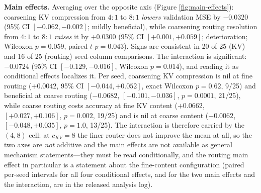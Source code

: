 \textbf{Main effects.} Averaging over the opposite axis (Figure
\ref{fig:main-effects}): coarsening KV compression from $4{:}1$ to $8{:}1$
\emph{lowers} validation MSE by $-0.0320$ (95\% CI $[-0.062, -0.002]$; mildly beneficial),
while
coarsening routing resolution from $4{:}1$ to $8{:}1$ \emph{raises} it by
$+0.0300$ (95\% CI $[+0.001, +0.059]$; deterioration; Wilcoxon $p = 0.059$,
paired $t$ $p = 0.043$). Signs are consistent in 20 of 25 (KV) and 16 of 25
(routing) seed-column comparisons. The interaction is significant:
$-0.0724$ (95\% CI $[-0.129, -0.016]$, Wilcoxon $p = 0.014$), and reading it as
conditional effects localizes it. Per seed, coarsening KV compression is nil at
fine routing ($+0.0042$, 95\% CI $[-0.044, +0.052]$, exact Wilcoxon $p = 0.62$,
9/25) and beneficial at coarse routing ($-0.0682$, $[-0.101, -0.036]$,
$p = 0.0001$, 21/25), while coarse routing costs accuracy at fine KV content
($+0.0662$, $[+0.027, +0.106]$, $p = 0.002$, 19/25) and is nil at coarse content
($-0.0062$, $[-0.048, +0.035]$, $p = 1.0$, 13/25). The interaction is therefore carried by the
$(4,8)$ cell: at $c_{KV}{=}8$ the finer router does not improve the
mean at all, so the two axes are \emph{not} additive and the main effects are not
available as general mechanism statements---they must be read conditionally, and
the routing main effect in particular is a statement about the fine-content
configuration (paired per-seed intervals for all four conditional effects, and
for the two main effects and the interaction, are in the released analysis log).

